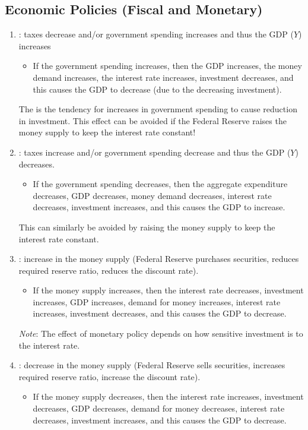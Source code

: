 \documentclass{article}
\begin{document}
\subsection{Economic Policies (Fiscal and Monetary)}

\begin{enumerate}
  \item {}: taxes decrease and/or government spending increases and thus the GDP ($Y$) increases 
    \begin{itemize}
      \item If the government spending increases, then the GDP increases, the money demand increases, the interest rate increases, investment decreases, and this causes the GDP to decrease (due to the decreasing investment). 
    \end{itemize}
    The  is the tendency for increases in government spending to cause reduction in investment. This effect can be avoided if the Federal Reserve raises the money supply to keep the interest rate constant!
  \item {}: taxes increase and/or government spending decrease and thus the GDP ($Y$) decreases. 
    \begin{itemize}
      \item If the government spending decreases, then the aggregate expenditure decreases, GDP decreases, money demand decreases, interest rate decreases, investment increases, and this causes the GDP to increase. 
    \end{itemize}
    This can similarly be avoided by raising the money supply to keep the interest rate constant. 
  \item {}: increase in the money supply (Federal Reserve purchases securities, reduces required reserve ratio, reduces the discount rate). 
    \begin{itemize}
      \item If the money supply increases, then the interest rate decreases, investment increases, GDP increases, demand for money increases, interest rate increases, investment decreases, and this causes the GDP to decrease. 
    \end{itemize}
    \emph{Note}: The effect of monetary policy depends on how sensitive investment is to the interest rate. 
  \item {}: decrease in the money supply (Federal Reserve sells securities, increases required reserve ratio, increase the discount rate). 
    \begin{itemize}
      \item If the money supply decreases, then the interest rate increases, investment decreases, GDP decreases, demand for money decreases, interest rate decreases, investment increases, and this causes the GDP to decrease. 
    \end{itemize}
\end{enumerate}
\end{document}
